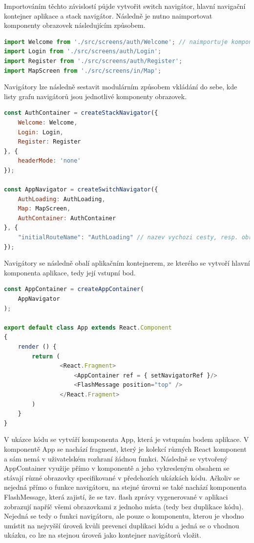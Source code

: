 Importováním těchto závislostí půjde vytvořit switch navigátor, hlavní navigační kontejner aplikace a stack navigátor. Následně je nutno naimportovat komponenty obrazovek následujícím způsobem.

\begin{lstlisting}[language=JavaScript, caption=Import obrazovek pro hlavní navigátor]
import Welcome from './src/screens/auth/Welcome'; // naimportuje komponentu obrazovky Welcome
import Login from './src/screens/auth/Login';
import Register from './src/screens/auth/Register';
import MapScreen from './src/screens/in/Map';
\end{lstlisting}

Navigátory lze následně sestavit modulárním způsobem vkládání do sebe, kde listy grafu navigátorů jsou jednotlivé komponenty obrazovek.

\begin{lstlisting}[language=JavaScript, caption=Implementace navigátorů]
const AuthContainer = createStackNavigator({
	Welcome: Welcome,
	Login: Login,
	Register: Register
}, {
	headerMode: 'none'
});

const AppNavigator = createSwitchNavigator({
	AuthLoading: AuthLoading,
	Map: MapScreen,
	AuthContainer: AuthContainer
}, {
	"initialRouteName": "AuthLoading" // nazev vychozi cesty, resp. obrazovkove komponenty
});
\end{lstlisting}

Navigátory se následně obalí aplikačním kontejnerem, ze kterého se vytvoří hlavní komponenta aplikace, tedy její vstupní bod.

\begin{lstlisting}[language=JavaScript, caption=Vytvoření aplikačního kontejneru]
const AppContainer = createAppContainer(
	AppNavigator
);

export default class App extends React.Component
{
	render () {
		return (
				<React.Fragment>
					<AppContainer ref = { setNavigatorRef }/>
					<FlashMessage position="top" />
				</React.Fragment>
		)
	}
}
\end{lstlisting}

V ukázce kódu se vytváří komponenta App, která je vstupním bodem aplikace. V komponentě App se nachází fragment, který je kolekcí různých React komponent a sám nemá v uživatelském rozhraní žádnou funkci. Následně se vytvořený AppContainer využije přímo v komponentě a jeho vykresleným obsahem se stávají různé obrazovky specifikované v předchozích ukázkách kódu. Ačkoliv se nejedná přímo o funkce navigátoru, na stejné úrovni se také nachází komponenta FlashMessage, která zajistí, že se tzv. flash zprávy vygenerované v aplikaci zobrazují napříč všemi obrazovkami z jednoho místa (tedy bez duplikace kódu). Nejedná se tedy o funkci navigátoru, ale pouze o komponentu, kterou je vhodno umístit na nejvyšší úroveň kvůli prevenci duplikaci kódu a jedná se o vhodnou ukázku, co lze na stejnou úroveň jako kontejner navigátorů vložit.

